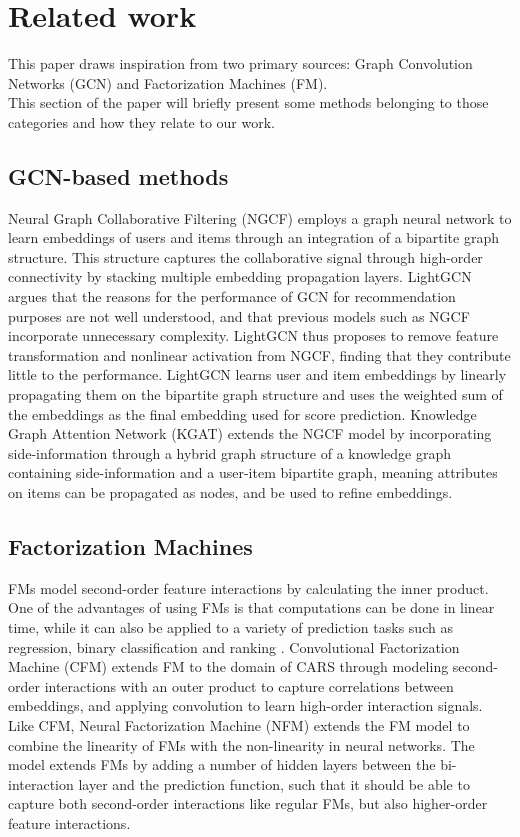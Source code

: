 \section{Related work}\label{sec:relatedwork}
This paper draws inspiration from two primary sources: Graph Convolution Networks (GCN) and Factorization Machines (FM).\\
This section of the paper will briefly present some methods belonging to those categories and how they relate to our work.

\subsection{GCN-based methods}
Neural Graph Collaborative Filtering (NGCF) \cite{NGCF} employs a graph neural network to learn embeddings of users and items through an integration of a bipartite graph structure.
This structure captures the collaborative signal through high-order connectivity by stacking multiple embedding propagation layers.
LightGCN \cite{LightGCN} argues that the reasons for the performance of GCN for recommendation purposes are not well understood, and that previous models such as NGCF incorporate unnecessary complexity.
LightGCN thus proposes to remove feature transformation and nonlinear activation from NGCF, finding that they contribute little to the performance.
LightGCN learns user and item embeddings by linearly propagating them on the bipartite graph structure and uses the weighted sum of the embeddings as the final embedding used for score prediction.
Knowledge Graph Attention Network (KGAT) \cite{KGAT} extends the NGCF model by incorporating side-information through a hybrid graph structure of a knowledge graph containing side-information and a user-item bipartite graph, meaning attributes on items can be propagated as nodes, and be used to refine embeddings.

\subsection{Factorization Machines}
FMs \cite{fmrendle} model second-order feature interactions by calculating the inner product.
One of the advantages of using FMs is that computations can be done in linear time, while it can also be applied to a variety of prediction tasks such as regression, binary classification and ranking \cite{fmrendle}.
Convolutional Factorization Machine (CFM) \cite{CFM} extends FM to the domain of CARS through modeling second-order interactions with an outer product to capture correlations between embeddings, and applying convolution to learn high-order interaction signals.
Like CFM, Neural Factorization Machine (NFM) \cite{NeuralFM} extends the FM model to combine the linearity of FMs with the non-linearity in neural networks.
The model extends FMs by adding a number of hidden layers between the bi-interaction layer and the prediction function, such that it should be able to capture both second-order interactions like regular FMs, but also higher-order feature interactions. 

